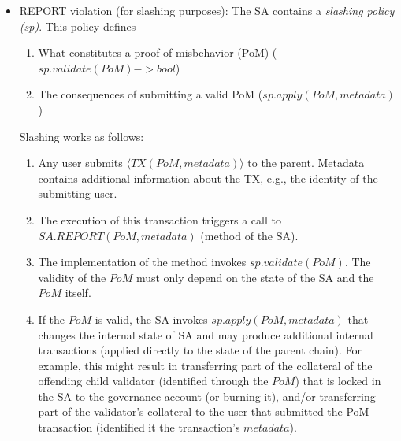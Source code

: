 \begin{itemize}
    \item REPORT violation (for slashing purposes):
    The SA contains a \emph{slashing policy (sp)}. This policy defines
    \begin{enumerate}
        \item What constitutes a proof of misbehavior (PoM) ($sp.validate(PoM) -> bool$)
        \item The consequences of submitting a valid PoM ($sp.apply(PoM, metadata)$)
    \end{enumerate}
    Slashing works as follows:
    \begin{enumerate}
        \item Any user submits $\langle TX(PoM, metadata)\rangle$ to the parent. Metadata contains additional information about the TX, e.g., the identity of the submitting user.
        \item The execution of this transaction triggers a call to $SA.REPORT(PoM, metadata)$ (method of the SA).
        \item The implementation of the method invokes $sp.validate(PoM)$. The validity of the $PoM$ must only depend on the state of the SA and the $PoM$ itself.
        \item If the $PoM$ is valid, the SA invokes $sp.apply(PoM, metadata)$ that changes the internal state of SA and may produce additional internal transactions (applied directly to the state of the parent chain). For example, this might result in transferring part of the collateral of the offending child validator (identified through the $PoM$) that is locked in the SA to the governance account (or burning it), and/or transferring part of the validator's collateral to the user that submitted the PoM transaction (identified it the transaction's $metadata$).
    \end{enumerate}



\end{itemize}
